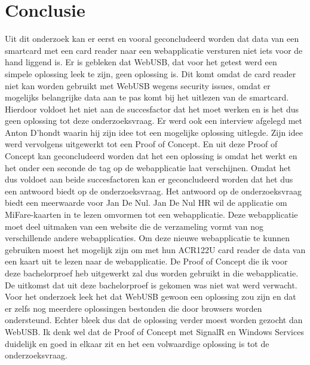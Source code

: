 
\chapter{Conclusie}%
\label{ch:conclusie}


Uit dit onderzoek kan er eerst en vooral geconcludeerd worden dat data van een smartcard met een card reader naar een webapplicatie versturen niet iets voor de hand liggend is. Er is gebleken dat WebUSB, dat voor het getest werd een simpele oplossing leek te zijn, geen oplossing is. Dit komt omdat de card reader niet kan worden gebruikt met WebUSB wegens security issues, omdat er mogelijks belangrijke data aan te pas komt bij het uitlezen van de smartcard. Hierdoor voldoet het niet aan de succesfactor dat het moet werken en is het dus geen oplossing tot deze onderzoeksvraag.
Er werd ook een interview afgelegd met Anton D'hondt waarin hij zijn idee tot een mogelijke oplossing uitlegde. Zijn idee werd vervolgens uitgewerkt tot een Proof of Concept. En uit deze Proof of Concept kan geconcludeerd worden dat het een oplossing is omdat het werkt en het onder een seconde de tag op de webapplicatie laat verschijnen. Omdat het dus voldoet aan beide succesfactoren kan er geconcludeerd worden dat het dus een antwoord biedt op de onderzoeksvraag.
Het antwoord op de onderzoeksvraag biedt een meerwaarde voor Jan De Nul. Jan De Nul HR wil de applicatie om MiFare-kaarten in te lezen omvormen tot een webapplicatie. Deze webapplicatie moet deel uitmaken van een website die de verzameling vormt van nog verschillende andere webapplicaties. Om deze nieuwe webapplicatie te kunnen gebruiken moest het mogelijk zijn om met hun ACR122U card reader de data van een kaart uit te lezen naar de webapplicatie. De Proof of Concept die ik voor deze bachelorproef heb uitgewerkt zal dus worden gebruikt in die webapplicatie.
De uitkomst dat uit deze bachelorproef is gekomen was niet wat werd verwacht. Voor het onderzoek leek het dat WebUSB gewoon een oplossing zou zijn en dat er zelfs nog meerdere oplossingen bestonden die door browsers worden ondersteund. Echter bleek dus dat de oplossing verder moest worden gezocht dan WebUSB. Ik denk wel dat de Proof of Concept met SignalR en Windows Services duidelijk en goed in elkaar zit en het een volwaardige oplossing is tot de onderzoeksvraag.

